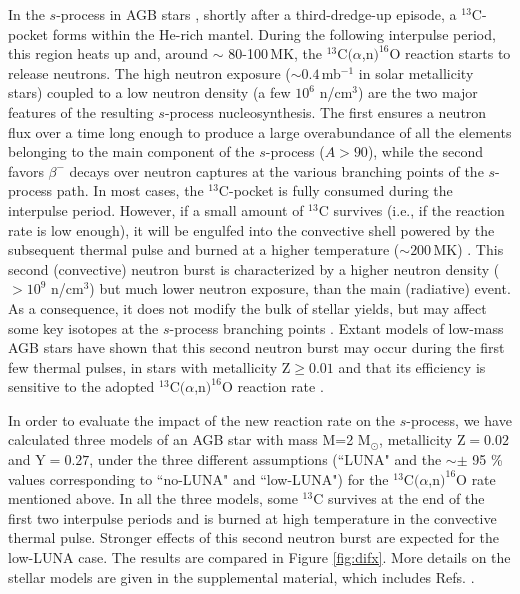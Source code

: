\documentclass[%
reprint,
groupedaddress,
showpacs,
nofootinbib,
amsmath,amssymb,
aps,
prl,
superscriptaddress,
notitlepage,
floatfix
]{revtex4-2}
\begin{document}
In the $s$-process in AGB stars \cite{straniero:1995,gallino:1998}, shortly after a third-dredge-up episode, a $^{13}$C-pocket forms within the He-rich mantel. During the following interpulse period, this region heats up and, around $\sim$ 80-100\,MK, the $^{13}$C$(\alpha$,n$)^{16}$O reaction starts to release neutrons. The high neutron exposure ($\sim0.4$\,mb$^{-1}$ in solar metallicity stars) coupled to a low neutron density (a few $10^6$ n/cm$^3$) are the two major features of the resulting $s$-process nucleosynthesis. The first  ensures a neutron flux over a time long enough to produce a large overabundance of all the elements belonging to the main component of the $s$-process ($A> 90$), while the second favors  $\beta^-$ decays over neutron captures at the various branching points of the $s$-process path. In most cases, the $^{13}$C-pocket is fully consumed during the interpulse period. However, if a small amount of $^{13}$C survives (i.e., if the reaction rate is low enough), it will be engulfed into the convective shell powered by the subsequent thermal pulse and burned at a higher temperature ($\sim 200$\,MK) \cite{cristallo:2009}. 
This second (convective) neutron burst is characterized by a higher neutron density ($>10^{9}$ n/cm$^3$) but much lower neutron exposure, than the main (radiative) event. As a consequence, it does not modify the bulk of stellar yields, but may affect some key isotopes at the $s$-process branching points \cite{bisterzo:2015}. Extant models of low-mass AGB stars  have shown that this second neutron burst may occur during the first few thermal pulses, in stars with metallicity Z$\geq 0.01$ and that its efficiency is sensitive to the adopted $^{13}$C$(\alpha$,n$)^{16}$O reaction rate \cite{Cristallo:2018}.

In order to evaluate the impact of the new reaction rate on the $s$-process, we have calculated three models of an AGB star with mass M=2 M$_\odot$, metallicity Z$=0.02$ and Y$=0.27$, under the three different assumptions (``LUNA" and the $\sim \pm$ 95 \% values corresponding to ``no-LUNA" and ``low-LUNA") for the $^{13}$C$(\alpha$,n$)^{16}$O rate mentioned above. In all the three models, some $^{13}$C survives at the end of the first two interpulse periods and is burned at high temperature in the convective thermal pulse. Stronger effects of this second neutron burst are expected for the low-LUNA case. The results are compared in Figure \ref{fig:difx}. More details on the stellar models are given in the supplemental material, which includes Refs. \cite{Cristallo:2011, Vescovi:2020, Karakas:2016}.
\end{document}
